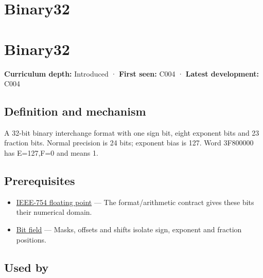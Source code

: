 \hypertarget{appendix-5057f9ad327f}{}
\section*{Binary32}
\section{Binary32}\label{appendix-5057f9ad327f-binary32}

\textbf{Curriculum depth:} Introduced · \textbf{First seen:} C004 · \textbf{Latest development:} C004

\subsection{Definition and mechanism}\label{appendix-5057f9ad327f-definition-and-mechanism}

A 32-bit binary interchange format with one sign bit, eight exponent bits and 23 fraction bits. Normal precision is 24 bits; exponent bias is 127. Word 3F800000 has E=127,F=0 and means 1.

\subsection{Prerequisites}\label{appendix-5057f9ad327f-prerequisites}

\begin{itemize}
\tightlist
\item
  \hyperref[appendix-343615f49ddf]{IEEE-754 floating point} --- The format/arithmetic contract gives these bits their numerical domain.
\item
  \hyperref[appendix-ac697f5c66e8]{Bit field} --- Masks, offsets and shifts isolate sign, exponent and fraction positions.
\end{itemize}

\subsection{Used by}\label{appendix-5057f9ad327f-used-by}

